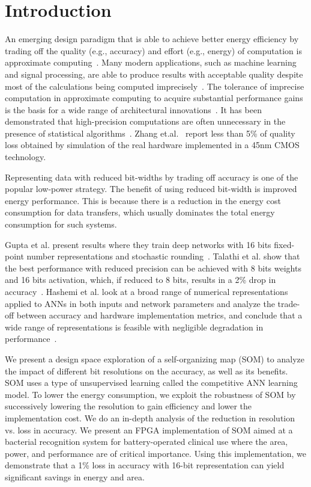 \section{Introduction}
An emerging design paradigm that is able to achieve better energy efficiency by trading off the quality (e.g., accuracy) and effort (e.g., energy) of computation is approximate computing~\cite{Zhang2014}. Many modern applications, such as machine learning and signal processing, are able to produce results with acceptable quality despite most of the calculations being computed imprecisely~\cite{Ye2013}. The tolerance of imprecise computation in approximate computing to acquire substantial performance gains is the basis for a wide range of architectural innovations~\cite{Esmaeilzadeh2012}. It has been demonstrated that high-precision computations are often unnecessary in the presence of statistical algorithms~\cite{Moons2017,Zhang2015}. Zhang et.al.~\cite{Zhang2015} report less than 5\% of quality loss obtained by simulation of the real hardware implemented in a 45nm CMOS technology.

Representing data with reduced bit-widths by trading off accuracy is one of the popular low-power strategy. The benefit of using reduced bit-width is improved energy performance. This is because there is a reduction in the energy cost consumption for data transfers, which usually dominates the total energy consumption for such systems.

Gupta et al. present results where they train deep networks with 16 bits fixed-point number representations and stochastic rounding~\cite{Gupta2015}. Talathi et al. show that the best performance with reduced precision can be achieved with 8 bits weights and 16 bits activation, which, if reduced to 8 bits, results in a 2\% drop in accuracy~\cite{lin2016overcoming}. Hashemi et al. look at a broad range of numerical representations applied to ANNs in both inputs and network parameters and analyze the trade-off between accuracy and hardware implementation metrics, and conclude that a wide range of representations is feasible with negligible degradation in performance~\cite{Hashemi2017}.

We present a design space exploration of a self-organizing map (SOM) to analyze the impact of different bit resolutions on the accuracy, as well as its benefits. SOM uses a type of unsupervised learning called the competitive ANN learning model. To lower the energy consumption, we exploit the robustness of SOM by successively lowering the resolution to gain efficiency and lower the implementation cost. We do an in-depth analysis of the reduction in resolution vs. loss in accuracy. We present an FPGA implementation of SOM aimed at a bacterial recognition system for battery-operated clinical use where the area, power, and performance are of critical importance. Using this implementation, we demonstrate that a 1\% loss in accuracy with 16-bit representation can yield significant savings in energy and area.

